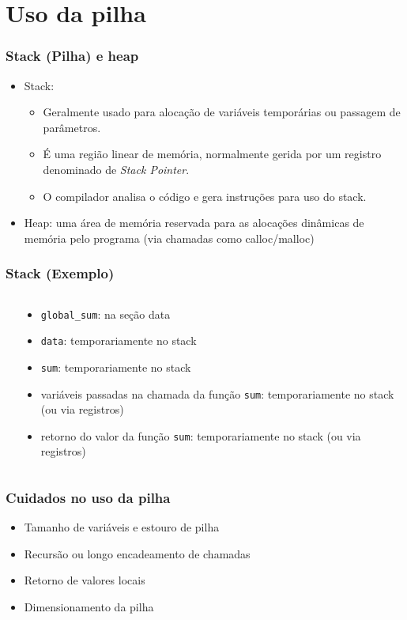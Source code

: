 \documentclass{beamer}
\begin{document}
\section{Uso da pilha}

\begin{frame}
	\frametitle{Stack (Pilha) e heap}
	\begin{itemize}
	\item Stack:
	\begin{itemize}
		\item Geralmente usado para alocação de variáveis temporárias ou passagem de parâmetros.
		\item É uma região linear de memória, normalmente gerida por um registro denominado de \textit{Stack Pointer}.
		\item O compilador analisa o código e gera instruções para uso do stack.
	\end{itemize}
	\item Heap: uma área de memória reservada para as alocações dinâmicas de memória pelo programa (via chamadas como calloc/malloc)
	\end{itemize}
\end{frame}

\begin{frame}
	\frametitle{Stack (Exemplo)}
	\begin{columns}[T] %
	\begin{column}{.55\textwidth}
		
	\end{column}%
	\hfill%
	\begin{column}{.45\textwidth}
    {\footnotesize
	\begin{itemize}
	\item \texttt{global\_sum}: na seção data
    \item \texttt{data}: temporariamente no stack
    \item \texttt{sum}: temporariamente no stack
    \item variáveis passadas na chamada da função \texttt{sum}: temporariamente no stack (ou via registros)
    \item retorno do valor da função \texttt{sum}: temporariamente  no stack (ou via registros)
	\end{itemize}
    }
	\end{column}%
\end{columns}
\end{frame}

\begin{frame}
	\frametitle{Cuidados no uso da pilha}
	\begin{itemize}
	\item Tamanho de variáveis e estouro de pilha
	\item Recursão ou longo encadeamento de chamadas
	\item Retorno de valores locais
	\item Dimensionamento da pilha
	\end{itemize}
\end{frame}
\end{document}
